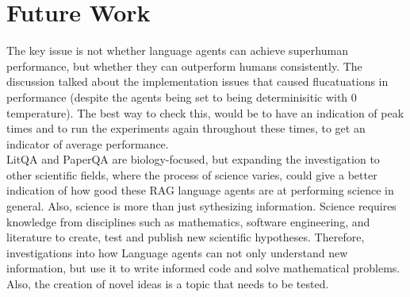 \section{Future Work}
The key issue is not whether language agents can achieve superhuman performance, but whether they can outperform humans consistently. The discussion talked about the implementation issues that caused flucatuations in performance (despite the agents being set to being determinisitic with 0 temperature). The best way to check this, would be to have an indication of peak times and to run the experiments again throughout these times, to get an indicator of average performance. \\

LitQA and PaperQA are biology-focused, but expanding the investigation to other scientific fields, where the process of science varies, could give a better indication of how good these RAG language agents are at performing science in general. Also, science is more than just sythesizing information. Science requires knowledge from disciplines such as mathematics, software engineering, and literature to create, test and publish new scientific hypotheses. Therefore, investigations into how Language agents can not only understand new information, but use it to write informed code and solve mathematical problems. Also, the creation of novel ideas is a topic that needs to be tested. \\